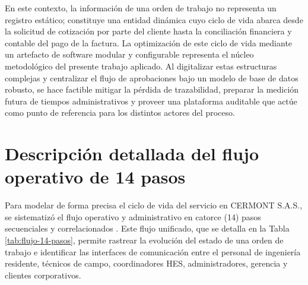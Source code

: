 En este contexto, la información de una orden de trabajo no representa un registro estático; constituye una entidad dinámica cuyo ciclo de vida abarca desde la solicitud de cotización por parte del cliente hasta la conciliación financiera y contable del pago de la factura. La optimización de este ciclo de vida mediante un artefacto de software modular y configurable representa el núcleo metodológico del presente trabajo aplicado. Al digitalizar estas estructuras complejas y centralizar el flujo de aprobaciones bajo un modelo de base de datos robusto, se hace factible mitigar la pérdida de trazabilidad, preparar la medición futura de tiempos administrativos y proveer una plataforma auditable que actúe como punto de referencia para los distintos actores del proceso.

\section{Descripción detallada del flujo operativo de 14 pasos}
\label{sec:flujo-14-pasos}

Para modelar de forma precisa el ciclo de vida del servicio en CERMONT S.A.S., se sistematizó el flujo operativo y administrativo en catorce (14) pasos secuenciales y correlacionados \cite{proceso_cermont}. Este flujo unificado, que se detalla en la Tabla \ref{tab:flujo-14-pasos}, permite rastrear la evolución del estado de una orden de trabajo e identificar las interfaces de comunicación entre el personal de ingeniería residente, técnicos de campo, coordinadores HES, administradores, gerencia y clientes corporativos.

